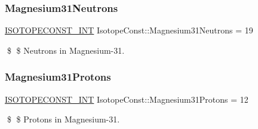 \subsubsection{\texorpdfstring{Magnesium31\+Neutrons}{Magnesium31Neutrons}}
{\footnotesize\ttfamily \mbox{\hyperlink{group___isotope_const-_macros_ga5f18360b3e99483a35c32d789e62621c}{I\+S\+O\+T\+O\+P\+E\+C\+O\+N\+S\+T\+\_\+\+I\+NT}} Isotope\+Const\+::\+Magnesium31\+Neutrons = 19}

\$ \$ Neutrons in Magnesium-\/31. \mbox{\label{group___isotope_const-_magnesium-_mg31_ga538195b18fb6384a40b9087c50a030ef}} 
\subsubsection{\texorpdfstring{Magnesium31\+Protons}{Magnesium31Protons}}
{\footnotesize\ttfamily \mbox{\hyperlink{group___isotope_const-_macros_ga5f18360b3e99483a35c32d789e62621c}{I\+S\+O\+T\+O\+P\+E\+C\+O\+N\+S\+T\+\_\+\+I\+NT}} Isotope\+Const\+::\+Magnesium31\+Protons = 12}

\$ \$ Protons in Magnesium-\/31. 